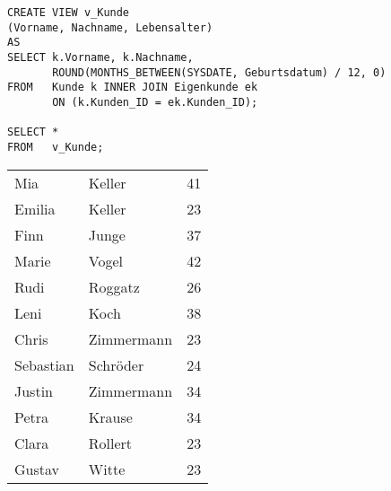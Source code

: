 \begin{lstlisting}[language=oracle_sql,caption={Eine einfache View mit Spaltenaliasliste},label=sql08_29]
CREATE VIEW v_Kunde
(Vorname, Nachname, Lebensalter)
AS
SELECT k.Vorname, k.Nachname,
       ROUND(MONTHS_BETWEEN(SYSDATE, Geburtsdatum) / 12, 0)
FROM   Kunde k INNER JOIN Eigenkunde ek
       ON (k.Kunden_ID = ek.Kunden_ID);

SELECT *
FROM   v_Kunde;
        \end{lstlisting}
\clearpage
\begin{center}
    \begin{small}
        \tablehead{}

        \begin{oraclesql}
            \begin{supertabular}{llr}
                Mia & Keller & 41 \\
                Emilia & Keller & 23 \\
                Finn & Junge & 37 \\
                Marie & Vogel & 42 \\
                Rudi & Roggatz & 26 \\
                Leni & Koch & 38 \\
                Chris & Zimmermann & 23 \\
                Sebastian & Schröder & 24 \\
                Justin & Zimmermann & 34 \\
                Petra & Krause & 34 \\
                Clara & Rollert & 23 \\
                Gustav & Witte & 23 \\
            \end{supertabular}
        \end{oraclesql}
    \end{small}
\end{center}
